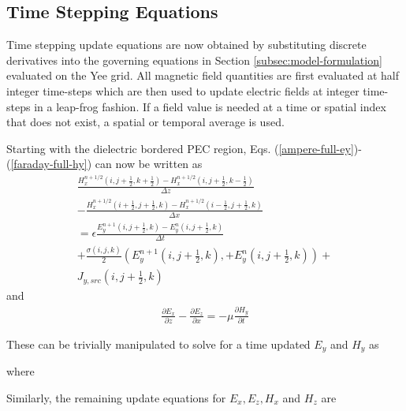 \subsection{Time Stepping Equations}
\label{subsec:timestepeqs}
Time stepping update equations are now obtained by substituting discrete derivatives into the governing equations in Section \ref{subsec:model-formulation} evaluated on the Yee grid. All magnetic field quantities are first evaluated at half integer time-steps which are then used to update electric fields at integer time-steps in a leap-frog fashion. If a field value is needed at a time or spatial index that does not exist, a spatial or temporal average is used.

Starting with the dielectric bordered PEC region, Eqs. (\ref{ampere-full-ey})-(\ref{faraday-full-hy}) can now be written as
\begin{multline}
	\frac{H_x^{n+1/2}(i,j+\frac{1}{2},k+\frac{1}{2}) - H_x^{n+1/2}(i,j+\frac{1}{2},k-\frac{1}{2})}{\Delta z} \\  - \frac{H_x^{n+1/2}(i+\frac{1}{2},j+\frac{1}{2},k) - H_x^{n+1/2}(i-\frac{1}{2},j+\frac{1}{2},k)}{\Delta x} \\  = \epsilon\frac{E_y^{n+1}(i,j+\frac{1}{2},k) - E_y^{n}(i,j+\frac{1}{2},k)}{\Delta t} \\ + \frac{\sigma(i,j,k)}{2}(E_y^{n+1}(i,j+\tfrac{1}{2},k),+E_y^{n}(i,j+\tfrac{1}{2},k)) + \\ J_{y,src}(i,j+\frac{1}{2},k)
	\label{eq:discrete-faraday}
\end{multline}
and
\begin{align}
	\frac{\partial E_x}{\partial z} - \frac{\partial E_z}{\partial x} =-\mu\frac{\partial H_y}{\partial t}
	\label{eq:discrete-ampere}
\end{align}

These can be trivially manipulated to solve for a time updated $E_y$ and $H_y$ as

where

Similarly, the remaining update equations for $E_x, E_z, H_x$ and $H_z$ are